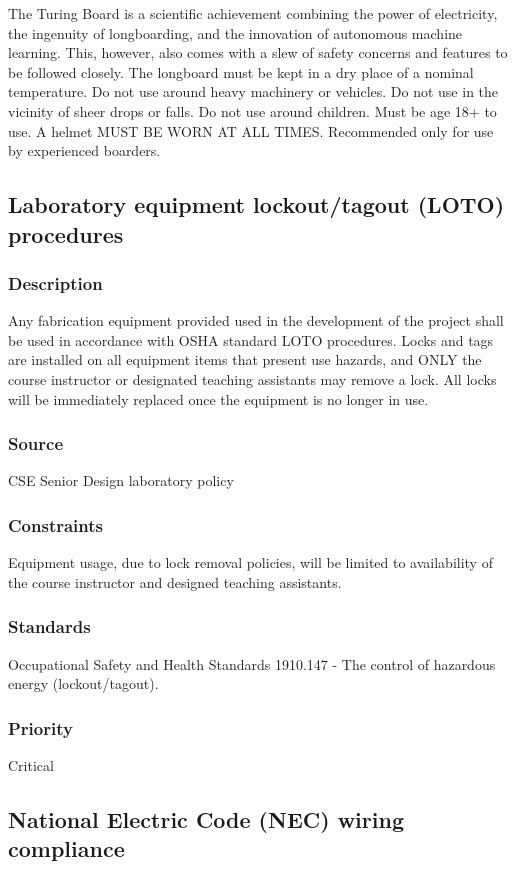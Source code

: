 The Turing Board is a scientific achievement combining the power of electricity, the ingenuity of longboarding, and the innovation of autonomous machine learning. This, however, also comes with a slew of safety concerns and features to be followed closely. The longboard must be kept in a dry place of a nominal temperature. Do not use around heavy machinery or vehicles. Do not use in the vicinity of sheer drops or falls. Do not use around children. Must be age 18+ to use. A helmet MUST BE WORN AT ALL TIMES. Recommended only for use by experienced boarders. 

\subsection{Laboratory equipment lockout/tagout (LOTO) procedures}
\subsubsection{Description}
Any fabrication equipment provided used in the development of the project shall be used in accordance with OSHA standard LOTO procedures. Locks and tags are installed on all equipment items that present use hazards, and ONLY the course instructor or designated teaching assistants may remove a lock. All locks will be immediately replaced once the equipment is no longer in use.
\subsubsection{Source}
CSE Senior Design laboratory policy
\subsubsection{Constraints}
Equipment usage, due to lock removal policies, will be limited to availability of the course instructor and designed teaching assistants.
\subsubsection{Standards}
Occupational Safety and Health Standards 1910.147 - The control of hazardous energy (lockout/tagout).
\subsubsection{Priority}
Critical

\subsection{National Electric Code (NEC) wiring compliance}
